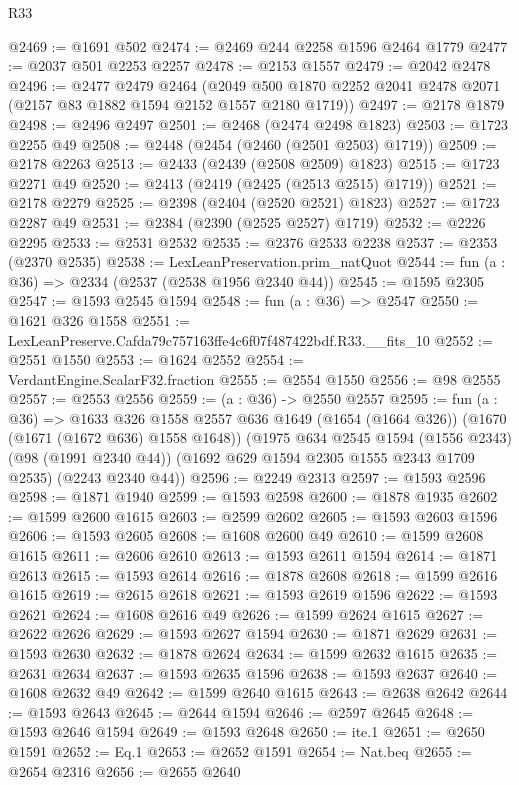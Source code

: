 \begin{lexlean}{R33}
\begin{coremodule}
@2469 := @1691 @502
@2474 := @2469 @244 @2258 @1596 @2464 @1779
@2477 := @2037 @501 @2253 @2257
@2478 := @2153 @1557
@2479 := @2042 @2478
@2496 := @2477
    @2479
    @2464
    (@2049 @500 @1870 @2252 @2041 @2478 @2071 (@2157 @83 @1882 @1594 @2152 @1557 @2180 @1719))
@2497 := @2178 @1879
@2498 := @2496 @2497
@2501 := @2468 (@2474 @2498 @1823)
@2503 := @1723 @2255 @49
@2508 := @2448 (@2454 (@2460 (@2501 @2503) @1719))
@2509 := @2178 @2263
@2513 := @2433 (@2439 (@2508 @2509) @1823)
@2515 := @1723 @2271 @49
@2520 := @2413 (@2419 (@2425 (@2513 @2515) @1719))
@2521 := @2178 @2279
@2525 := @2398 (@2404 (@2520 @2521) @1823)
@2527 := @1723 @2287 @49
@2531 := @2384 (@2390 (@2525 @2527) @1719)
@2532 := @2226 @2295
@2533 := @2531 @2532
@2535 := @2376 @2533 @2238
@2537 := @2353 (@2370 @2535)
@2538 := LexLeanPreservation.prim_natQuot
@2544 := fun (a : @36) => @2334 (@2537 (@2538 @1956 @2340 @44))
@2545 := @1595 @2305
@2547 := @1593 @2545 @1594
@2548 := fun (a : @36) => @2547
@2550 := @1621 @326 @1558
@2551 := LexLeanPreserve.Cafda79c757163ffe4c6f07f487422bdf.R33.__fits_10
@2552 := @2551 @1550
@2553 := @1624 @2552
@2554 := VerdantEngine.ScalarF32.fraction
@2555 := @2554 @1550
@2556 := @98 @2555
@2557 := @2553 @2556
@2559 := (a : @36) -> @2550 @2557
@2595 := fun (a : @36) =>
  @1633
    @326
    @1558
    @2557
    @636
    @1649
    (@1654 (@1664 @326))
    (@1670 (@1671 (@1672 @636) @1558 @1648))
    (@1975
      @634
      @2545
      @1594
      (@1556 @2343)
      (@98 (@1991 @2340 @44))
      (@1692 @629 @1594 @2305 @1555 @2343 @1709 @2535)
      (@2243 @2340 @44))
@2596 := @2249 @2313
@2597 := @1593 @2596
@2598 := @1871 @1940
@2599 := @1593 @2598
@2600 := @1878 @1935
@2602 := @1599 @2600 @1615
@2603 := @2599 @2602
@2605 := @1593 @2603 @1596
@2606 := @1593 @2605
@2608 := @1608 @2600 @49
@2610 := @1599 @2608 @1615
@2611 := @2606 @2610
@2613 := @1593 @2611 @1594
@2614 := @1871 @2613
@2615 := @1593 @2614
@2616 := @1878 @2608
@2618 := @1599 @2616 @1615
@2619 := @2615 @2618
@2621 := @1593 @2619 @1596
@2622 := @1593 @2621
@2624 := @1608 @2616 @49
@2626 := @1599 @2624 @1615
@2627 := @2622 @2626
@2629 := @1593 @2627 @1594
@2630 := @1871 @2629
@2631 := @1593 @2630
@2632 := @1878 @2624
@2634 := @1599 @2632 @1615
@2635 := @2631 @2634
@2637 := @1593 @2635 @1596
@2638 := @1593 @2637
@2640 := @1608 @2632 @49
@2642 := @1599 @2640 @1615
@2643 := @2638 @2642
@2644 := @1593 @2643
@2645 := @2644 @1594
@2646 := @2597 @2645
@2648 := @1593 @2646 @1594
@2649 := @1593 @2648
@2650 := ite.{1}
@2651 := @2650 @1591
@2652 := Eq.{1}
@2653 := @2652 @1591
@2654 := Nat.beq
@2655 := @2654 @2316
@2656 := @2655 @2640

\end{coremodule}
\end{lexlean}
